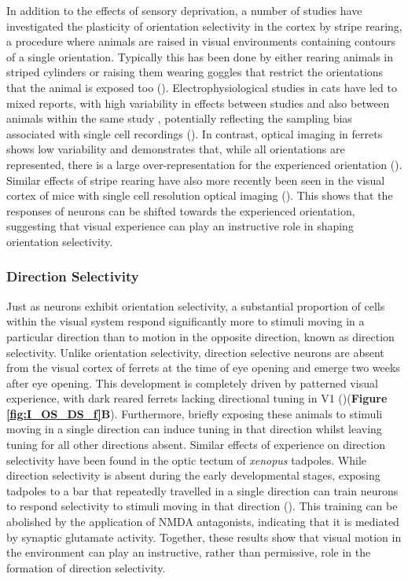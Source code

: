 In addition to the effects of sensory deprivation, a number of studies have investigated the plasticity of orientation selectivity in the cortex by stripe rearing, a procedure where animals are raised in visual environments containing contours of a single orientation. Typically this has been done by either rearing animals in striped cylinders or raising them wearing goggles that restrict the orientations that the animal is exposed too (\cite{Blakemore1970, Stryker1975ModificationReexamination, Freeman1973AlterationAsymmetries}). Electrophysiological studies in cats have led to mixed reports, with high variability in effects between studies and also between animals within the same study , potentially reflecting the sampling bias associated with single cell recordings (\cite{Blakemore1970, Stryker1975ModificationReexamination, Blakemore1977GeneticCortex.}). In contrast, optical imaging in ferrets shows low variability and demonstrates that, while all orientations are represented, there is a large over-representation for the experienced orientation (\cite{Sengpiel1999InfluenceCortex}). Similar effects of stripe rearing have also more recently been seen in the visual cortex of mice with single cell resolution optical imaging (\cite{Kreile2011AlteredCortex}). This shows that the responses of neurons can be shifted towards the experienced orientation, suggesting that visual experience can play an instructive role in shaping orientation selectivity. 

\subsubsection{Direction Selectivity}
Just as neurons exhibit orientation selectivity, a substantial proportion of cells within the visual system respond significantly more to stimuli moving in a particular direction than to motion in the opposite direction, known as direction selectivity. Unlike orientation selectivity, direction selective neurons are absent from the visual cortex of ferrets at the time of eye opening and emerge two weeks after eye opening. This development is completely driven by patterned visual experience, with dark reared ferrets lacking directional tuning in V1 (\cite{Li2006TheExperience})(\textbf{Figure \ref{fig:I_OS_DS_f}B}). Furthermore, briefly exposing these animals to stimuli moving in a single direction can induce tuning in that direction whilst leaving tuning for all other directions absent. Similar effects of experience on direction selectivity have been found in the optic tectum of \textit{xenopus} tadpoles. While direction selectivity is absent during the early developmental stages, exposing tadpoles to a bar that repeatedly travelled in a single direction can train neurons to respond selectivity to stimuli moving in that direction (\cite{Engert2002MovingNeurons}). This training can be abolished by the application of NMDA antagonists, indicating that it is mediated by synaptic glutamate activity. Together, these results show that visual motion in the environment can play an instructive, rather than permissive, role in the formation of direction selectivity.

